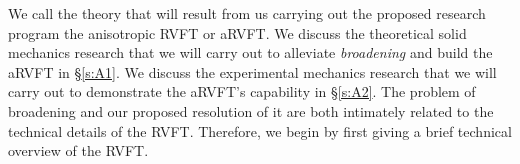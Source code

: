 \documentclass[10pt,letterpaper]{article}
\begin{document}
We call the  theory that will result  from  us carrying out the proposed research program the  anisotropic RVFT or  aRVFT. We discuss the  theoretical solid mechanics research that  we will carry out  to  alleviate \textit{broadening} and build the  aRVFT   in \S\ref{s:A1}.  We discuss the   experimental mechanics research that we will carry out  to demonstrate the aRVFT's capability  in \S\ref{s:A2}. The problem of broadening and our proposed resolution of it are both intimately related to the technical details of the RVFT. Therefore, we begin by first giving a brief technical overview of the RVFT.






\end{document}

